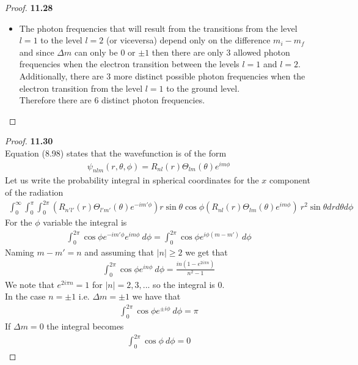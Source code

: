 \documentclass[11pt]{article}
\theoremstyle{definition}
\begin{document}
\begin{proof}{\textbf{11.28}}
\begin{itemize}
\item [\textbf{(d)}] The photon frequencies that will result from the
transitions from the level $l= 1$ to the level $l = 2$ (or viceversa)
depend only on the difference $m_i - m_f$ and since $\Delta m$ can only be 0
or $\pm 1$ then there are only 3 allowed photon frequencies when the electron
transition between the levels $l = 1$ and $l = 2$.\\
Additionally, there are 3 more distinct possible photon frequencies when the
electron transition from the level $l = 1$ to the ground level.\\
Therefore there are 6 distinct photon frequencies.
\end{itemize}
\end{proof}

\cleardoublepage
\begin{proof}{\textbf{11.30}}\\
Equation (8.98) states that the wavefunction is of the form
\begin{align*}
    \psi_{nlm}(r, \theta, \phi) = R_{nl}(r)\Theta_{lm}(\theta) e^{im\phi}
\end{align*}
Let us write the probability integral in spherical coordinates for the $x$
component of the radiation
\begin{align*}
    \int_0^\infty \int_0^\pi \int_0^{2\pi}
    (R_{n'l'}(r)\Theta_{l'm'}(\theta)e^{-im'\phi})
    r\sin\theta\cos\phi
    (R_{nl}(r)\Theta_{lm}(\theta)e^{im\phi})
    ~r^2 \sin\theta dr d\theta d\phi
\end{align*}
For the $\phi$ variable the integral is 
\begin{align*}
    \int_0^{2\pi} \cos\phi e^{-im'\phi} e^{im\phi} ~ d\phi
     = \int_0^{2\pi} \cos\phi e^{i\phi(m-m')} ~ d\phi
\end{align*}
Naming $m - m' = n$ and assuming that $|n| \geq 2$ we get that
\begin{align*}
    \int_0^{2\pi} \cos\phi e^{in\phi} ~ d\phi
    = \frac{i n(1 - e^{2i\pi n})}{n^2 - 1}
\end{align*}
We note that $e^{2i\pi n} = 1$ for $|n| = 2, 3, ...$ so the integral is 0.\\
In the case $n = \pm 1$ i.e. $\Delta m = \pm 1$ we have that 
\begin{align*}
    \int_0^{2\pi} \cos\phi e^{\pm i\phi} ~ d\phi = \pi
\end{align*}
If $\Delta m = 0$ the integral becomes
\begin{align*}
    \int_0^{2\pi} \cos\phi ~ d\phi = 0
\end{align*}

\end{proof}
\end{document}
